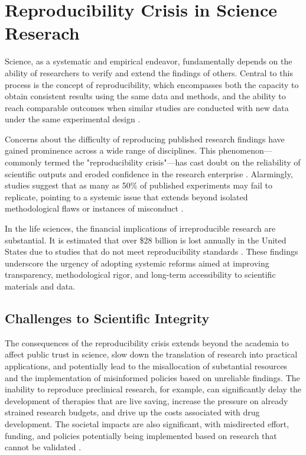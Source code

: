 \documentclass[final]{rc-book-2.14}
\begin{document}
\newpage

\section{Reproducibility Crisis in Science Reserach}
\label{chp:review:sec:rep_crisis}

Science, as a systematic and empirical endeavor, fundamentally depends on the ability of researchers to verify and extend the findings of others. Central to this process is the concept of reproducibility, which encompasses both the capacity to obtain consistent results using the same data and methods, and the ability to reach comparable outcomes when similar studies are conducted with new data under the same experimental design \cite{pellizzari_reproducibility_2017, committee_2019}. 

Concerns about the difficulty of reproducing published research findings have gained prominence across a wide range of disciplines. This phenomenon—commonly termed the "reproducibility crisis"—has cast doubt on the reliability of scientific outputs and eroded confidence in the research enterprise \cite{baker2016reproducibility}. Alarmingly, studies suggest that as many as 50\% of published experiments may fail to replicate, pointing to a systemic issue that extends beyond isolated methodological flaws or instances of misconduct \cite{branch_reproducibility_2019}. 

In the life sciences, the financial implications of irreproducible research are substantial. It is estimated that over \$28 billion is lost annually in the United States due to studies that do not meet reproducibility standards \cite{freedman2015economics}. These findings underscore the urgency of adopting systemic reforms aimed at improving transparency, methodological rigor, and long-term accessibility to scientific materials and data.


\subsection{Challenges to Scientific Integrity}

The consequences of the reproducibility crisis extends beyond the academia to affect public trust in science, slow down the translation of research into practical applications, and potentially lead to the misallocation of substantial resources and the implementation of misinformed policies based on unreliable findings. The inability to reproduce preclinical research, for example, can significantly delay the development of therapies that are live saving, increase the pressure on already strained research budgets, and drive up the costs associated with drug development. The societal impacts are also significant, with misdirected effort, funding, and policies potentially being implemented based on research that cannot be validated \cite{freedman2015economics}.
\end{document}
